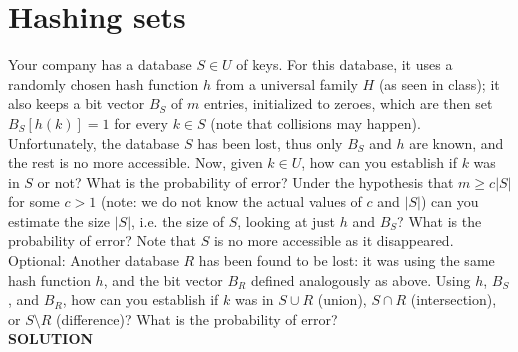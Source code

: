 \documentclass[a4paper]{article}
\begin{document}
\section*{Hashing sets}
Your company has a database $S \in U$ of keys. For this database, it uses a randomly chosen hash function $h$ from a universal family $H$ (as seen in class); it also keeps a bit vector $B_S$ of $m$ entries, initialized to zeroes, which are then set $B_S[h(k)] = 1$ for every $k \in S$ (note that collisions may happen). Unfortunately, the database $S$ has been lost, thus only $B_S$ and $h$ are known, and the rest is no more accessible. Now, given $k \in U$, how can you establish if $k$ was in $S$ or not? What is the probability of error? Under the hypothesis that $m \geq c|S|$ for some $c > 1$ (note: we do not know the actual values of $c$ and $|S|$) can you estimate the size $|S|$, i.e. the size of $S$, looking at just $h$ and $B_S$? What is the probability of error? Note that $S$ is no more accessible as it disappeared.\\ 
Optional: Another database $R$ has been found to be lost: it was using the same hash function $h$, and the bit vector $B_R$ defined analogously as above. Using $h$, $B_S$, and $B_R$, how can you establish if $k$ was in $S \cup R$ (union), $S \cap R$ (intersection), or $S \setminus R$ (difference)? What is the probability of error?
\\
\textbf{SOLUTION}
\\
\end{document}
